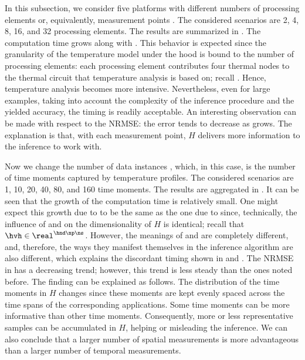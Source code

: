 
In this subsection, we consider five platforms with different numbers of
processing elements or, equivalently, measurement points \np. The considered
scenarios are 2, 4, 8, 16, and 32 processing elements. The results are
summarized in . The computation time grows along with
\np. This behavior is expected since the granularity of the temperature model
under the hood is bound to the number of processing elements: each processing
element contributes four thermal nodes to the thermal  circuit that
temperature analysis is based on; recall . Hence,
temperature analysis becomes more intensive. Nevertheless, even for large
examples, taking into account the complexity of the inference procedure and the
yielded accuracy, the timing is readily acceptable. An interesting observation
can be made with respect to the \ac{NRMSE}: the error tends to decrease as \np
grows. The explanation is that, with each measurement point, $H$ delivers more
information to the inference to work with.


Now we change the number of data instances \ns, which, in this case, is the
number of time moments captured by temperature profiles. The considered
scenarios are 1, 10, 20, 40, 80, and 160 time moments. The results are
aggregated in . It can be seen that the growth of the
computation time is relatively small. One might expect this growth due to \ns to
be the same as the one due to \np since, technically, the influence of \np and
\ns on the dimensionality of $H$ is identical; recall that $\hvh \in \real^{\hnd
\np \ns}$. However, the meanings of \np and \ns are completely different, and,
therefore, the ways they manifest themselves in the inference algorithm are also
different, which explains the discordant timing shown in 
and . The \ac{NRMSE} in  has
a decreasing trend; however, this trend is less steady than the ones noted
before. The finding can be explained as follows. The distribution of the time
moments in $H$ changes since these moments are kept evenly spaced across the
time spans of the corresponding applications. Some time moments can be more
informative than other time moments. Consequently, more or less representative
samples can be accumulated in $H$, helping or misleading the inference. We can
also conclude that a larger number of spatial measurements is more advantageous
than a larger number of temporal measurements.


